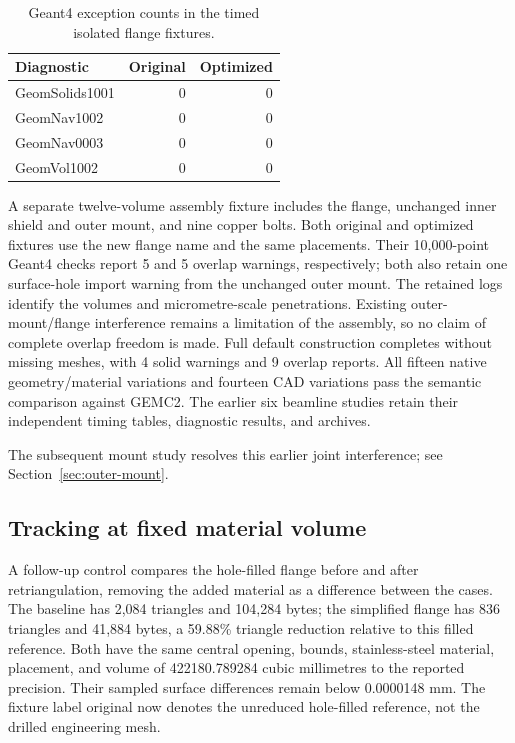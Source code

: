 \begin{table}[htbp]
\centering
\caption{Geant4 exception counts in the timed isolated flange fixtures.}
\label{tab:outer-flange-warnings}
\begin{tabular}{lrr}
\toprule
Diagnostic & Original & Optimized \\
\midrule
GeomSolids1001 & 0 & 0 \\
GeomNav1002 & 0 & 0 \\
GeomNav0003 & 0 & 0 \\
GeomVol1002 & 0 & 0 \\
\bottomrule
\end{tabular}
\end{table}

A separate twelve-volume assembly fixture includes the flange, unchanged inner shield and outer mount, and
nine copper bolts. Both original and optimized fixtures use the new flange name and the same placements.
Their 10,000-point Geant4 checks report 5 and 5 overlap warnings, respectively; both also retain one
surface-hole import warning from the unchanged outer mount. The retained logs identify the volumes and
micrometre-scale penetrations. Existing outer-mount/flange interference remains a limitation of the
assembly, so no claim of complete overlap freedom is made. Full default construction completes without
missing meshes, with 4 solid warnings and 9 overlap reports. All fifteen native geometry/material variations
and fourteen CAD variations pass the semantic comparison against GEMC2. The earlier six beamline studies
retain their independent timing tables, diagnostic results, and archives.

The subsequent mount study resolves this earlier joint interference; see Section~\ref{sec:outer-mount}.

\subsection{Tracking at fixed material volume}

A follow-up control compares the hole-filled flange before and after retriangulation, removing the added
material as a difference between the cases. The baseline has 2,084 triangles and 104,284 bytes; the
simplified flange has 836 triangles and 41,884 bytes, a 59.88\% triangle reduction relative to this filled
reference. Both have the same central opening, bounds, stainless-steel material, placement, and volume of
422180.789284 cubic millimetres to the reported precision. Their sampled surface differences remain below
0.0000148 mm. The fixture label original now denotes the unreduced hole-filled reference, not the drilled
engineering mesh.

